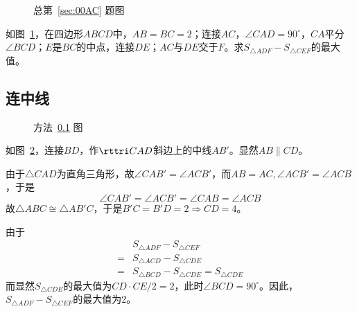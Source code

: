 

\begin{figure}[htbp]
  \centering {}
  \caption{总第~\ref{sec:00AC} 题图} \label{fig:00AC}
\end{figure}

如图~\ref{fig:00AC}，在四边形$ABCD$中，$AB = BC = 2$；连接$AC$，$\angle CAD = 90^\circ$，$CA$平分$\angle BCD$；$E$是$BC$的中点，连接$DE$；$AC$与$DE$交于$F$。求$S_{\triangle ADF} - S_{\triangle CEF}$的最大值。


\subsection{连中线} \label{subsec:00AC-mid}

\begin{figure}[htbp]
  \centering {}
  \caption{方法~\ref{subsec:00AC-mid} 图} \label{fig:00AC-mid}
\end{figure}

如图~\ref{fig:00AC-mid}，连接$BD$，作$\rttri CAD$斜边上的中线$AB'$。显然$AB \parallel CD$。

由于$\triangle CAD$为直角三角形，故$\angle CAB' = \angle ACB'$，而$AB = AC, \angle ACB' = \angle ACB$，于是
\[ \angle CAB' = \angle ACB' = \angle CAB = \angle ACB \]
故$\triangle ABC \cong \triangle AB'C$，于是$B'C = B'D = 2 \Rightarrow CD = 4$。

由于
\begin{align*}
  & S_{\triangle ADF} - S_{\triangle CEF} \\
  ={}& S_{\triangle ACD} - S_{\triangle CDE} \\
  ={}& S_{\triangle BCD} - S_{\triangle CDE} = S_{\triangle CDE}
\end{align*}
而显然$S_{\triangle CDE}$的最大值为$CD\cdot CE/2 = 2$，此时$\angle BCD = 90^\circ$。因此，$S_{\triangle ADF} - S_{\triangle CEF}$的最大值为2。
